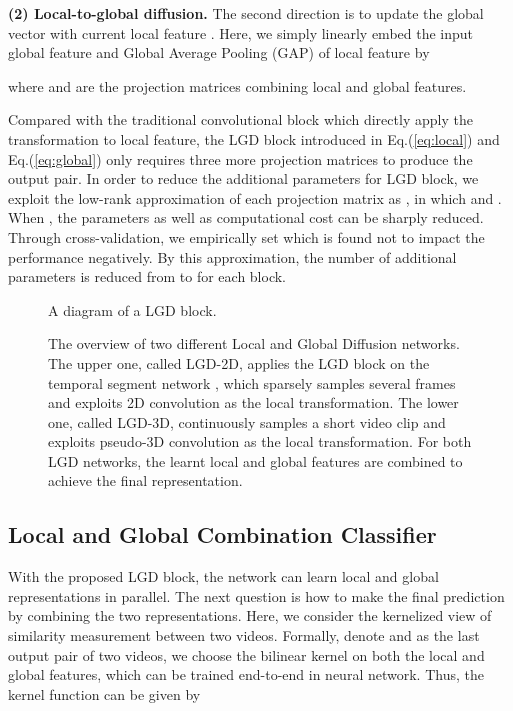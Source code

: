 \documentclass[10pt,twocolumn,letterpaper]{article}
\begin{document}
\textbf{(2) Local-to-global diffusion.} The second direction is to update the global vector with current local feature . Here, we simply linearly embed the input global feature  and Global Average Pooling (GAP) of local feature  by

where  and  are the projection matrices combining local and global features.


Compared with the traditional convolutional block which directly apply the transformation  to local feature, the LGD block introduced in Eq.(\ref{eq:local}) and Eq.(\ref{eq:global}) only requires three more projection matrices to produce the output pair. In order to reduce the additional parameters for LGD block, we exploit the low-rank approximation of each projection matrix as , in which  and . When , the parameters as well as computational cost can be sharply reduced. Through cross-validation, we empirically set  which is found not to impact the performance negatively. By this approximation, the number of additional parameters is reduced from  to  for each block.

\begin{figure}[!tb]
   \caption{\small A diagram of a LGD block. }
   \label{fig:block}
   \vspace{-0.15in}
\end{figure}

\begin{figure*}[!tb]
   \caption{\small The overview of two different Local and Global Diffusion networks. The upper one, called LGD-2D, applies the LGD block on the temporal segment network \cite{wang2016temporal}, which sparsely samples several frames and exploits 2D convolution as the local transformation. The lower one, called LGD-3D, continuously samples a short video clip and exploits pseudo-3D convolution \cite{qiu2017learning} as the local transformation. For both LGD networks, the learnt local and global features are combined to achieve the final representation.}
   \label{fig:framework}
   \vspace{-0.15in}
\end{figure*}

\subsection{Local and Global Combination Classifier} \label{fig:lgcc}
With the proposed LGD block, the network can learn local and global representations in parallel. The next question is how to make the final prediction by combining the two representations. Here, we consider the kernelized view of similarity measurement between two videos. Formally, denote  and  as the last output pair of two videos, we choose the bilinear kernel \cite{lin2015bilinear} on both the local and global features, which can be trained end-to-end in neural network. Thus, the kernel function can be given by
\end{document}
